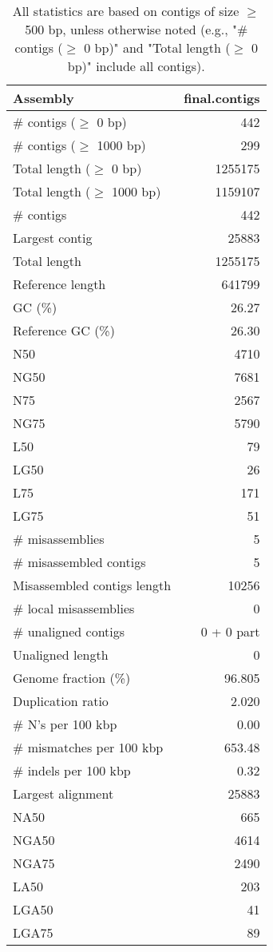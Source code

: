 \documentclass[12pt,a4paper]{article}
\begin{document}
\begin{table}[ht]
\begin{center}
\caption{All statistics are based on contigs of size $\geq$ 500 bp, unless otherwise noted (e.g., "\# contigs ($\geq$ 0 bp)" and "Total length ($\geq$ 0 bp)" include all contigs).}
\begin{tabular}{|l*{1}{|r}|}
\hline
Assembly & final.contigs \\ \hline
\# contigs ($\geq$ 0 bp) & 442 \\ \hline
\# contigs ($\geq$ 1000 bp) & 299 \\ \hline
Total length ($\geq$ 0 bp) & 1255175 \\ \hline
Total length ($\geq$ 1000 bp) & 1159107 \\ \hline
\# contigs & 442 \\ \hline
Largest contig & 25883 \\ \hline
Total length & 1255175 \\ \hline
Reference length & 641799 \\ \hline
GC (\%) & 26.27 \\ \hline
Reference GC (\%) & 26.30 \\ \hline
N50 & 4710 \\ \hline
NG50 & 7681 \\ \hline
N75 & 2567 \\ \hline
NG75 & 5790 \\ \hline
L50 & 79 \\ \hline
LG50 & 26 \\ \hline
L75 & 171 \\ \hline
LG75 & 51 \\ \hline
\# misassemblies & 5 \\ \hline
\# misassembled contigs & 5 \\ \hline
Misassembled contigs length & 10256 \\ \hline
\# local misassemblies & 0 \\ \hline
\# unaligned contigs & 0 + 0 part \\ \hline
Unaligned length & 0 \\ \hline
Genome fraction (\%) & 96.805 \\ \hline
Duplication ratio & 2.020 \\ \hline
\# N's per 100 kbp & 0.00 \\ \hline
\# mismatches per 100 kbp & 653.48 \\ \hline
\# indels per 100 kbp & 0.32 \\ \hline
Largest alignment & 25883 \\ \hline
NA50 & 665 \\ \hline
NGA50 & 4614 \\ \hline
NGA75 & 2490 \\ \hline
LA50 & 203 \\ \hline
LGA50 & 41 \\ \hline
LGA75 & 89 \\ \hline
\end{tabular}
\end{center}
\end{table}
\end{document}
